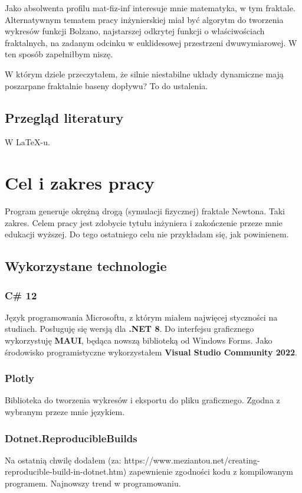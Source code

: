 \documentclass{SGGW-thesis}
\begin{document}
Jako absolwenta profilu mat-fiz-inf interesuje mnie matematyka, w tym fraktale. Alternatywnym tematem pracy inżynierskiej miał być algorytm do tworzenia wykresów funkcji Bolzano, najstarszej odkrytej funkcji o właściwościach fraktalnych, na zadanym odcinku w euklidesowej przestrzeni dwuwymiarowej. W ten sposób zapełniłbym niszę.

W którym dziele przeczytałem, że silnie niestabilne układy dynamiczne mają poszarpane fraktalnie baseny dopływu? To do ustalenia. 

\section{Przegląd literatury}
W \LaTeX-u.\cite{talbot2013}

\chapter{Cel i zakres pracy}
Program generuje okrężną drogą (symulacji fizycznej) fraktale Newtona. Taki zakres. Celem pracy jest zdobycie tytułu inżyniera i zakończenie przeze mnie edukacji wyższej. Do tego ostatniego celu nie przykładam się, jak powinienem.
\section{Wykorzystane technologie}

\subsection{C\# 12}
Język programowania Microsoftu, z którym miałem najwięcej styczności na studiach. Posługuję się wersją dla \textbf{.NET 8}. Do interfejsu graficznego wykorzystuję \textbf{MAUI}, będąca nowszą biblioteką od Windows Forms. Jako środowisko programistyczne wykorzystałem \textbf{Visual Studio Community 2022}.
\subsection{Plotly}
Biblioteka do tworzenia wykresów i eksportu do pliku graficznego. Zgodna z wybranym przeze mnie językiem.
\subsection{Dotnet.ReproducibleBuilds}
Na ostatnią chwilę dodałem  (za: https://www.meziantou.net/creating-reproducible-build-in-dotnet.htm) zapewnienie zgodności kodu z kompilowanym programem. Najnowszy trend w programowaniu.
\end{document}
